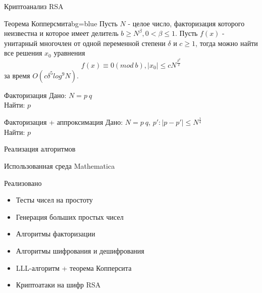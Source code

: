 \begin{frame}{Криптоанализ RSA}			

	\changefontsizes{10pt}

	\begin{importantblock}{Теорема Копперсмита}{}{bg=blue}
		Пусть $N$ - целое число, факторизация которого неизвестна и которое имеет делитель {$b \ge N^\beta, 0 < \beta \le 1$}. Пусть {$f(x)$} - 
		унитарный многочлен от одной переменной степени {$\delta$} и {$c \ge 1$}, тогда можно найти все решения {$x_0$} уравнения
		    \begin{equation}
		      f(x) \equiv 0(mod \: b), |x_0| \le c N^{\frac{\beta^2}{\delta}}
		    \end{equation}
		за время {$O(c \delta^5 log^9 N)$}.
	\end{importantblock}	 
	
	\begin{block}{Факторизация}
		Дано: $N = p \: q$ \\
		Найти: $p$
	\end{block}	

	\begin{block}{Факторизация + аппроксимация}
		Дано: $N = p \: q$, $p': |p-p'| \le N^\frac{1}{4}$ \\
		Найти: $p$
	\end{block}		 

	\changefontsizes{13pt}
	
\end{frame}

\begin{frame}{Реализация алгоритмов}			

	\begin{block}{Использованная среда}
		Mathematica
	\end{block}	 
	
	\begin{block}{Реализовано}
		\begin{itemize}
	        \item Тесты чисел на простоту
	        \item Генерация больших простых чисел
	        \item Алгоритмы факторизации
	        \item Алгоритмы шифрования и дешифрования
	        \item LLL-алгоритм + теорема Копперсита
	        \item Криптоатаки на шифр RSA
		\end{itemize}
	\end{block}	 
	
\end{frame}